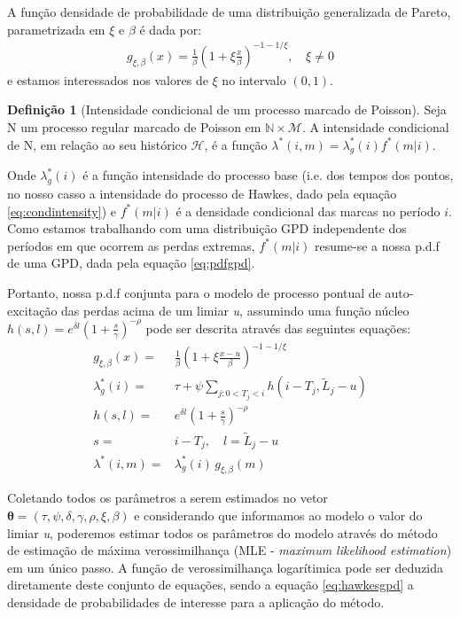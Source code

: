\documentclass[review]{elsarticle}
\theoremstyle{definition}
\newtheorem{defi}[teor]{Definição}
\begin{document}
A função densidade de probabilidade de uma distribuição generalizada de Pareto, parametrizada em $\xi$ e $\beta$ é dada por:
\begin{align}
\label{eq:pdfgpd}
g_{\xi, \beta}(x)=\frac{1}{\beta}\left(1+\xi\frac{x}{\beta}\right)^{-1-1/\xi}, &\,\xi \neq 0
\end{align}
e estamos interessados nos valores de $\xi$ no intervalo $(0, 1)$.

\begin{defi}[Intensidade condicional de um processo marcado de Poisson]
	Seja N um processo regular marcado de Poisson em $\mathbb{N}\times\mathcal{M}$. A intensidade condicional de N, em relação ao seu histórico $\mathcal{H}$, é a função $\lambda^*(i, m)=\lambda^*_g(i)f^*(m|i)$.
\end{defi}
Onde $\lambda^*_g(i)$ é a função intensidade do processo base (i.e. dos tempos dos pontos, no nosso casso a intensidade do processo de Hawkes, dado pela equação \eqref{eq:condintensity}) e $f^*(m|i)$ é a densidade condicional das marcas no período $i$. Como estamos trabalhando com uma distribuição GPD independente dos períodos em que ocorrem as perdas extremas, $f^*(m|i)$ resume-se a nossa p.d.f de uma GPD, dada pela equação \eqref{eq:pdfgpd}.

Portanto, nossa p.d.f conjunta para o modelo de processo pontual de auto-excitação das perdas acima de um limiar \emph{u}, assumindo uma função núcleo $h(s, l)=e^{\delta l}\left(1+\frac{s}{\gamma}\right)^{-\rho}$ pode ser descrita através das seguintes equações:
\begin{align}
g_{\xi, \beta}(x)=&\frac{1}{\beta}\left(1+\xi\frac{x-u}{\beta}\right)^{-1-1/\xi} \\
\lambda^*_g(i)=&\tau+\psi\sum_{j:0<T_j<i}h(i-T_j, \tilde{L}_j-u) \\
h(s, l)=&e^{\delta l}\left(1+\frac{s}{\gamma}\right)^{-\rho} \\
s=&i-T_j, \quad l=\tilde{L}_j-u \\
\lambda^*(i, m)=&\lambda^*_g(i)\, g_{\xi, \beta}(m) \label{eq:hawkesgpd}
\end{align}

Coletando todos os parâmetros a serem estimados no vetor $\boldsymbol{\theta}=(\tau, \psi, \delta, \gamma, \rho, \xi, \beta )$ e considerando que informamos ao modelo o valor do limiar \emph{u}, poderemos estimar todos os parâmetros do modelo através do método de estimação de máxima verossimilhança (MLE - \emph{maximum likelihood estimation}) em um único passo. A função de verossimilhança logarítimica pode ser deduzida diretamente deste conjunto de equações, sendo a equação \eqref{eq:hawkesgpd} a densidade de probabilidades de interesse para a aplicação do método.
\end{document}
